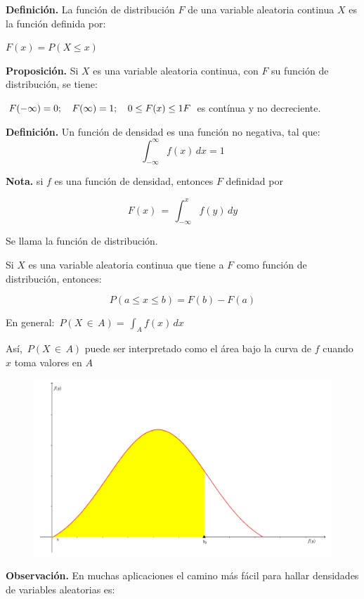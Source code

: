 \documentclass[11pt, a4paper]{article} %
\begin{document}
\textbf{Definición.} La función de distribución \(F\) de una variable aleatoria continua \(X\)  es la función definida por:

\(
F(x)=P(X \leq x)
\)

\textbf{Proposición.} Si \(X\) es una variable aleatoria continua, con \(F\) su función de distribución, se tiene:

\(
F(-\infty)=0; \quad	F(\infty)=1; \quad	0 \leq F(x) \leq 1\\
F
\) es contínua y no decreciente. 

\textbf{Definición.} Un función de densidad es una función no negativa, tal que:
\[
\int_{-\infty}^{\infty} f(x) \, dx=1
\]

\textbf{Nota.} si \(f\) es una función de densidad, entonces \(F\) definidad por

\[
F(x) \, = \, \int_{-\infty}^{x} f(y) \, dy
\]

Se llama la función de distribución.

Si \(X\) es una variable aleatoria continua que tiene a \(F\) como función de distribución, entonces:

\[
P(a \leq x \leq b) = F(b) - F(a)
\]

En general: 
\(
\, P(X \, \in \, A)= \, \int_{A} f(x) \, dx
\)

Así, 
\(
\, P(X \, \in \, A)
\)
puede ser interpretado como el área bajo la curva de \(f\) cuando \(x\) toma valores en \(A\)

\newpage

\begin{figure}[t!]
\centering
\includegraphics[scale=0.15]{distrnorm.pdf}
\end{figure}

\textbf{Observación.} En muchas aplicaciones el camino más fácil para hallar densidades de variables aleatorias es:
\end{document}
